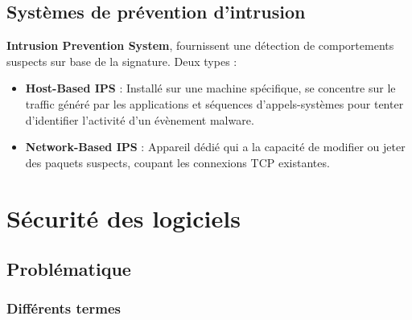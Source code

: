 \documentclass{report}
\begin{document}
	\section{Systèmes de prévention d'intrusion}

		\textbf{Intrusion Prevention System}, fournissent une détection de comportements suspects sur base de la signature. Deux types : \\

		\begin{itemize}
			\item \textbf{Host-Based IPS} : Installé sur une machine spécifique, se concentre sur le traffic généré par les applications et séquences d'appels-systèmes pour tenter d'identifier l'activité d'un évènement malware.\\
			\item \textbf{Network-Based IPS} : Appareil dédié qui a la capacité de modifier ou jeter des paquets suspects, coupant les connexions TCP existantes.\\
		\end{itemize}

\chapter{Sécurité des logiciels}

\section{Problématique}

\subsection{Différents termes}
\end{document}
